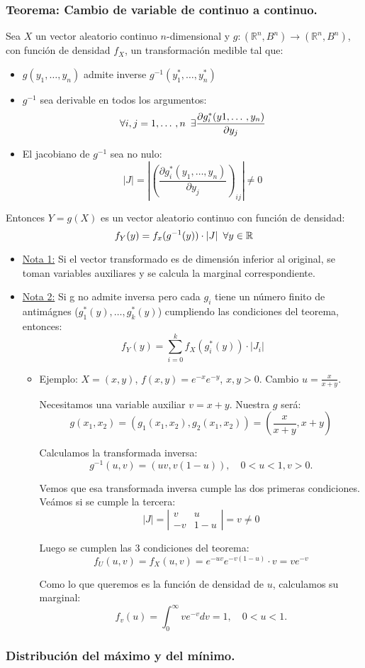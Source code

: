 \documentclass[a4paper, 11pt]{article}
\newcommand{\R}[1][]{\mathbb{R}^{#1}}
\begin{document}
\subsubsection*{Teorema: Cambio de variable de continuo a continuo.}
Sea $X$ un vector aleatorio continuo $n$-dimensional y $g:(\R[n],B^n)\longrightarrow (\R[n],B^n)$, con función de densidad $f_X$, un transformación medible tal que:
\begin{itemize}
\item $g(y_1,\dotso,y_n)$ admite inverse $g^{-1}(y_1^*,\dotso, y_n^*)$
\item $g^{-1}$ sea derivable en todos los argumentos:
\[
\forall i,j=1,\dotso, n \enskip \displaystyle\exists\displaystyle\frac{\partial g_i^*(y1,\dotso,y_n)}{\partial y_j}
\]
\item El jacobiano de $g^{-1}$ sea no nulo:
\[
\left|J\right|=\left|\left(\frac{\partial g_i^*(y_1,\dotso,y_n)}{\partial y_j}\right)_{ij}\right|\neq 0
\]
\end{itemize}
Entonces $Y=g(X)$ es un vector aleatorio continuo con función de densidad:
\[
f_Y(y)=f_x(g^{-1}(y))\cdot |J| \enskip \forall y\in\R
\]
\begin{itemize}
\item \underline{Nota 1:} Si el vector transformado es de dimensión inferior al original, se toman variables auxiliares y se calcula la marginal correspondiente.
\item \underline{Nota 2:} Si g no admite inversa pero cada $g_i$ tiene un número finito de antimágnes ($g_1^*(y),\dotso, g_k^*(y)$) cumpliendo las condiciones del teorema, entonces:
\[
f_Y(y)=\sum_{i=0}^k f_X(g_i^*(y))\cdot|J_i|
\]

\begin{itemize}
\item Ejemplo: $X=(x,y)$, $f(x,y)=e^{-x}e^{-y}$, $x,y>0$. Cambio $u=\frac{x}{x+y}$. 

Necesitamos una variable auxiliar $v=x+y$. Nuestra $g$ será:
\[
g(x_1,x_2)=(g_1(x_1,x_2), g_2(x_1,x_2))=\left(\frac{x}{x+y}, x+y\right)
\]

Calculamos la transformada inversa:
\[
g^{-1}(u,v)=(uv,v(1-u)),\quad 0<u<1,v>0.
\]

Vemos que esa transformada inversa cumple las dos primeras condiciones. Veámos si se cumple la tercera:
\[
|J|=\left|\begin{array}{cc}
v & u\\
-v & 1-u
\end{array}
\right| = v \neq 0
\]

Luego se cumplen las 3 condiciones del teorema:
\[f_U(u,v) = f_X(u,v)=e^{-uv}e^{-v(1-u)}\cdot v = ve^{-v}
\]

Como lo que queremos es la función de densidad de $u$, calculamos su marginal:
\[
f_v(u)=\int_0^\infty ve^{-v}dv=1, \quad 0<u<1.
\]

\end{itemize}

\end{itemize}

\subsubsection*{Distribución del máximo y del mínimo.}
\end{document}
